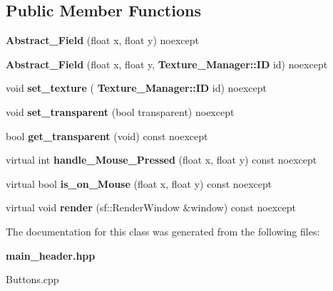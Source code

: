 \subsection*{Public Member Functions}
\begin{DoxyCompactItemize}
\item 
\mbox{\label{class_abstract___field_a97f869f349e8015e9d75b74db9cd80f1}} 
{\bfseries Abstract\+\_\+\+Field} (float x, float y) noexcept
\item 
\mbox{\label{class_abstract___field_ad0e859cfd1a759a8289f36b2b2d6595e}} 
{\bfseries Abstract\+\_\+\+Field} (float x, float y, \textbf{ Texture\+\_\+\+Manager\+::\+ID} id) noexcept
\item 
\mbox{\label{class_abstract___field_abc7aa6d6b6160a275da6d1cf1f842a95}} 
void {\bfseries set\+\_\+texture} (\textbf{ Texture\+\_\+\+Manager\+::\+ID} id) noexcept
\item 
\mbox{\label{class_abstract___field_a3798b5a3d66436e7387577252e8a4ad7}} 
void {\bfseries set\+\_\+transparent} (bool transparent) noexcept
\item 
\mbox{\label{class_abstract___field_aeab84f13667c01a0270883f7ef3b95a5}} 
bool {\bfseries get\+\_\+transparent} (void) const noexcept
\item 
\mbox{\label{class_abstract___field_aa3a501afd173d5e441481e3bc3102490}} 
virtual int {\bfseries handle\+\_\+\+Mouse\+\_\+\+Pressed} (float x, float y) const noexcept
\item 
\mbox{\label{class_abstract___field_a5403c00346a45dff0af4a13a2d932111}} 
virtual bool {\bfseries is\+\_\+on\+\_\+\+Mouse} (float x, float y) const noexcept
\item 
\mbox{\label{class_abstract___field_a6f27798053ffbe86d89e520c3ba1eac0}} 
virtual void {\bfseries render} (sf\+::\+Render\+Window \&window) const noexcept
\end{DoxyCompactItemize}


The documentation for this class was generated from the following files\+:\begin{DoxyCompactItemize}
\item 
\textbf{ main\+\_\+header.\+hpp}\item 
Buttons.\+cpp\end{DoxyCompactItemize}
